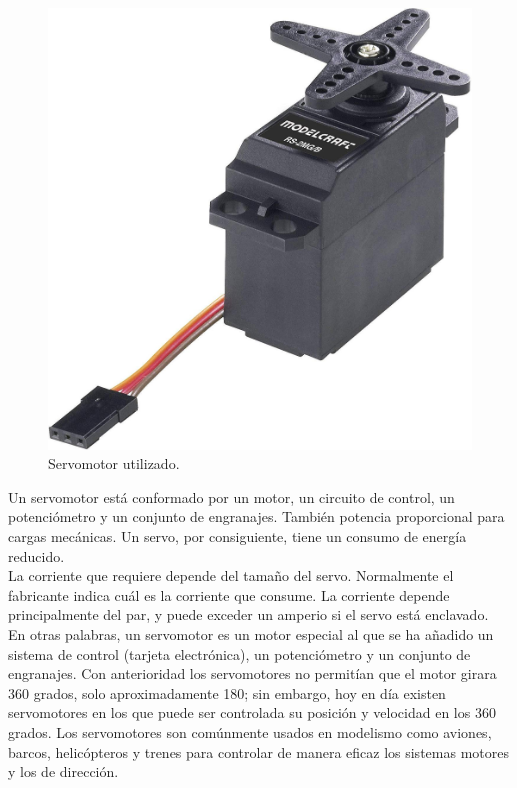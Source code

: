 \begin{figure}[H]
  \begin{center}
    \includegraphics[scale=0.1]{imagenes/servo.jpg}
  \end{center}
  \caption{Servomotor utilizado.}
  \label{figure:servomotor:}
\end{figure}

Un servomotor está conformado por un motor, un circuito de control, un potenciómetro y un conjunto de engranajes. También potencia proporcional para cargas mecánicas. Un servo,
por consiguiente, tiene un consumo de energía reducido.\\

La corriente que requiere depende del tamaño del servo. Normalmente el fabricante indica cuál es la corriente que consume. La corriente depende principalmente del par, y puede
exceder un amperio si el servo está enclavado.\\

En otras palabras, un servomotor es un motor especial al que se ha añadido un sistema de control (tarjeta electrónica), un potenciómetro y un conjunto de engranajes. Con 
anterioridad los servomotores no permitían que el motor girara 360 grados, solo aproximadamente 180; sin embargo, hoy en día existen servomotores en los que puede ser controlada
su posición y velocidad en los 360 grados. Los servomotores son comúnmente usados en modelismo como aviones, barcos, helicópteros y trenes para controlar de manera eficaz los sistemas
motores y los de dirección.\\

